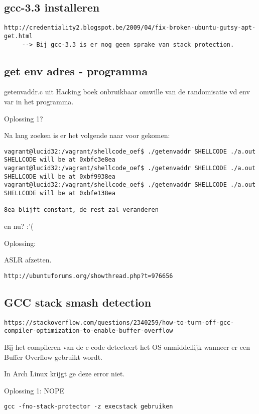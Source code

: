 \subsection{gcc-3.3 installeren}
\begin{lstlisting}
http://credentiality2.blogspot.be/2009/04/fix-broken-ubuntu-gutsy-apt-get.html
     --> Bij gcc-3.3 is er nog geen sprake van stack protection.
\end{lstlisting}

\subsection{get env adres - programma}
getenvaddr.c uit Hacking boek onbruikbaar omwille van de randomisatie vd env var in het programma.

Oplossing 1?

Na lang zoeken is er het volgende naar voor gekomen:
\begin{lstlisting}
vagrant@lucid32:/vagrant/shellcode_oef$ ./getenvaddr SHELLCODE ./a.out 
SHELLCODE will be at 0xbfc3e8ea
vagrant@lucid32:/vagrant/shellcode_oef$ ./getenvaddr SHELLCODE ./a.out 
SHELLCODE will be at 0xbf9938ea
vagrant@lucid32:/vagrant/shellcode_oef$ ./getenvaddr SHELLCODE ./a.out 
SHELLCODE will be at 0xbfe138ea

8ea blijft constant, de rest zal veranderen
\end{lstlisting}

en nu? :'(

Oplossing:

ASLR afzetten.

\begin{lstlisting}
http://ubuntuforums.org/showthread.php?t=976656
\end{lstlisting}


\subsection{GCC stack smash detection}
\begin{lstlisting}
https://stackoverflow.com/questions/2340259/how-to-turn-off-gcc-compiler-optimization-to-enable-buffer-overflow
\end{lstlisting}

Bij het compileren van de c-code detecteert het OS onmiddellijk wanneer er een Buffer Overflow gebruikt wordt.

In Arch Linux krijgt ge deze error niet.

Oplossing 1: NOPE
\begin{lstlisting}
gcc -fno-stack-protector -z execstack gebruiken
\end{lstlisting}

